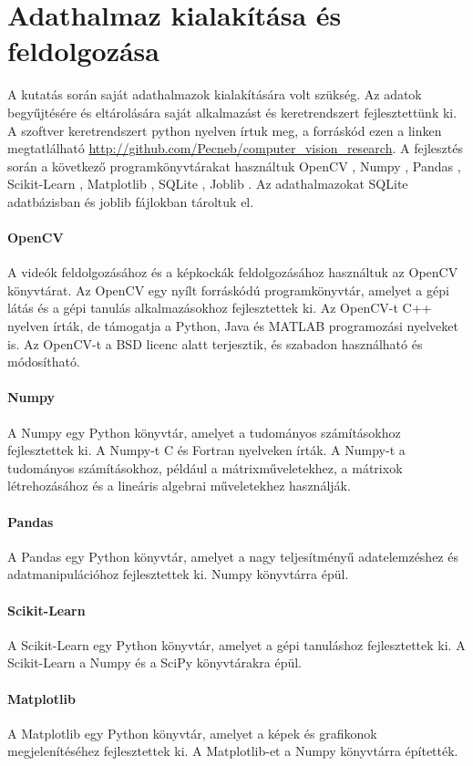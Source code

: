\documentclass[12pt,a4paper]{article}
\begin{document}
\newpage
\section{Adathalmaz kialakítása és feldolgozása}
A kutatás során saját adathalmazok kialakítására volt szükség. Az adatok begyűjtésére és eltárolására saját alkalmazást és keretrendszert
fejlesztettünk ki. A szoftver keretrendszert python nyelven írtuk meg, a forráskód ezen a linken megtatlálható \url{http://github.com/Pecneb/computer_vision_research}.
A fejlesztés során a következő programkönyvtárakat használtuk OpenCV \cite{opencv_library}, Numpy \cite{harris2020array}, Pandas \cite{reback2020pandas},
Scikit-Learn \cite{scikit-learn}, Matplotlib \cite{Hunter:2007}, SQLite \cite{sqlite2020hipp}, Joblib \cite{joblib_library}. Az adathalmazokat SQLite adatbázisban és
joblib fájlokban tároltuk el.
\paragraph{OpenCV} A videók feldolgozásához és a képkockák feldolgozásához használtuk az OpenCV könyvtárat. Az OpenCV egy nyílt forráskódú programkönyvtár, amelyet a gépi látás és a gépi tanulás alkalmazásokhoz fejlesztettek ki. Az OpenCV-t C++ nyelven írták, de támogatja a Python, Java és MATLAB programozási nyelveket is. Az OpenCV-t a BSD licenc alatt terjesztik, és szabadon használható és módosítható.
\paragraph{Numpy} A Numpy egy Python könyvtár, amelyet a tudományos számításokhoz fejlesztettek ki. A Numpy-t C és Fortran nyelveken írták. A Numpy-t a tudományos számításokhoz, például a mátrixműveletekhez, a mátrixok létrehozásához és a lineáris algebrai műveletekhez használják.
\paragraph{Pandas} A Pandas egy Python könyvtár, amelyet a nagy teljesítményű adatelemzéshez és adatmanipulációhoz fejlesztettek ki. Numpy könyvtárra épül.
\paragraph{Scikit-Learn} A Scikit-Learn egy Python könyvtár, amelyet a gépi tanuláshoz fejlesztettek ki. A Scikit-Learn a Numpy és a SciPy könyvtárakra épül.
\paragraph{Matplotlib} A Matplotlib egy Python könyvtár, amelyet a képek és grafikonok megjelenítéséhez fejlesztettek ki. A Matplotlib-et a Numpy könyvtárra építették.
\end{document}
